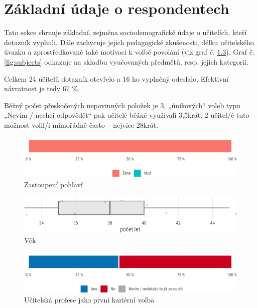 \documentclass[12pt,a4paper,]{report}
\begin{document}
\hypertarget{zuxe1kladnuxed-uxfadaje-o-respondentech}{%
\chapter{Základní údaje o respondentech}\label{zuxe1kladnuxed-uxfadaje-o-respondentech}}

Tato sekce shrnuje základní, zejména sociodemografické údaje o učitelích, kteří dotazník vyplnili. Dále zachycuje jejich pedagogické zkušenosti, délku učitelského úvazku a zprostředkovaně také motivaci k volbě povolání (viz graf č. \ref{fig:career}). Graf č. \ref{fig:subjects} odkazuje na skladbu vyučovaných předmětů, resp. jejich kategorií.

Celkem 24 učitelů dotazník otevřelo a 16 ho vyplněný odeslalo. Efektivní návratnost je tedy 67 \%.

Běžný počet přeskočených nepovinných položek je 3, „únikových`` voleb typu „Nevím / nechci odpovědět`` pak učitelé běžně využívali 3,5krát. 2 učitel/é tuto možnost volil/i mimořádně často -- nejvíce 28krát.

\begin{figure}

{\centering \includegraphics[width=\textwidth]{figs/sex-1}

}

\caption{Zastoupení pohlaví}\label{fig:sex}
\end{figure}

\begin{figure}

{\centering \includegraphics[width=\textwidth]{figs/age-1}

}

\caption{Věk}\label{fig:age}
\end{figure}

\begin{figure}

{\centering \includegraphics[width=\textwidth]{figs/career-1}

}

\caption{Učitelská profese jako první kariérní volba}\label{fig:career}
\end{figure}
\end{document}
